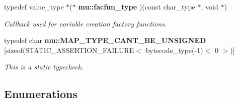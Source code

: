 \begin{CompactItemize}
typedef value\_\-type $\ast$($\ast$ {\bf mu::facfun\_\-type} )(const char\_\-type $\ast$, void $\ast$)
\begin{CompactList}\small\item\em Callback used for variable creation factory functions. \item\end{CompactList}\item 
typedef char {\bf mu::MAP\_\-TYPE\_\-CANT\_\-BE\_\-UNSIGNED} [sizeof(STATIC\_\-ASSERTION\_\-FAILURE$<$ bytecode\_\-type(-1)$<$ 0 $>$)]
\begin{CompactList}\small\item\em This is a static typecheck. \item\end{CompactList}\end{CompactItemize}
\subsection*{Enumerations}
